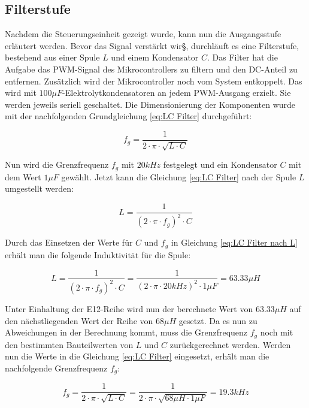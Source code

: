 \subsection{Filterstufe}\label{sec:filterstufe}
Nachdem die Steuerungseinheit gezeigt wurde, kann nun die Ausgangsstufe erläutert werden. Bevor das Signal verstärkt wir§, durchläuft es eine Filterstufe, bestehend aus einer Spule $L$ und einem Kondensator $C$. Das Filter hat die Aufgabe das PWM-Signal des Mikrocontrollers zu filtern und den DC-Anteil zu entfernen. Zusätzlich wird der Mikrocontroller noch vom System entkoppelt. Das wird mit $100\mu F$-Elektrolytkondensatoren an jedem PWM-Ausgang erzielt. Sie werden jeweils seriell geschaltet. Die Dimensionierung der Komponenten wurde mit der nachfolgenden Grundgleichung \ref{eq:LC Filter} durchgeführt:

\begin{equation}
f_g = \frac{1}{2\cdot \pi \cdot \sqrt{L\cdot C}}
\label{eq:LC Filter}
\end{equation}

Nun wird die Grenzfrequenz $f_g$ mit $20 kHz$ festgelegt und ein Kondensator $C$ mit dem Wert $1\mu F$ gewählt. Jetzt kann die Gleichung \ref{eq:LC Filter} nach der Spule $L$ umgestellt werden:

\begin{equation}
L = \frac{1}{(2\cdot \pi \cdot f_g)^2\cdot C }
\label{eq:LC Filter nach L}
\end{equation}

Durch das Einsetzen der Werte für $C$ und $f_g$ in Gleichung \ref{eq:LC Filter nach L} erhält man die folgende Induktivität für die Spule:

\begin{equation}
L = \frac{1}{(2\cdot \pi \cdot f_g)^2\cdot C } = \frac{1}{(2\cdot \pi \cdot 20 kHz)^2\cdot 1 \mu F } = 63.33\mu H
\label{eq:LC Filter nach L 1}
\end{equation}

Unter Einhaltung der {\glqq E12-Reihe\grqq} wird nun der berechnete Wert von $63.33\mu H$ auf den nächstliegenden Wert der Reihe von $68\mu H$ gesetzt. Da es nun zu Abweichungen in der Berechnung kommt, muss die Grenzfrequenz $f_g$ noch mit den bestimmten Bauteilwerten von $L$ und $C$ zurückgerechnet werden. Werden nun die Werte in die Gleichung \ref{eq:LC Filter} eingesetzt, erhält man die nachfolgende Grenzfrequenz $f_g$:

\begin{equation}
f_g = \frac{1}{2\cdot \pi \cdot \sqrt{L\cdot C}} = \frac{1}{2\cdot \pi \cdot \sqrt{68\mu H \cdot 1 \mu F}} = 19.3 kHz
\label{eq:LC Filter 1}
\end{equation}

